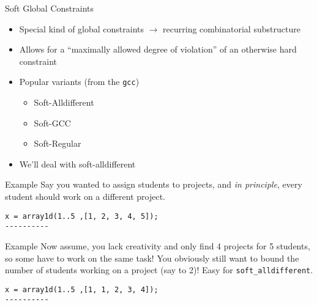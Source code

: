 \documentclass[10pt,xcolor={dvipsnames},fleqn]{beamer}
\begin{document}
\begin{frame}{Soft Global Constraints}
\begin{itemize}
\item Special kind of global constraints $\rightarrow$ recurring combinatorial substructure
\item Allows for a ``maximally allowed degree of violation'' of an otherwise hard constraint

\vspace*{2ex}
\item Popular variants (from the \texttt{gcc})
\begin{itemize}
\item Soft-Alldifferent
\item Soft-GCC
\item Soft-Regular
\end{itemize}
\item We'll deal with \alert{soft-alldifferent}
\end{itemize}
\end{frame}

\begin{frame}[fragile]{Example}
Say you wanted to assign students to projects, and \emph{in principle},
every student should work on a different project.


\begin{verbatim}
x = array1d(1..5 ,[1, 2, 3, 4, 5]);
----------
\end{verbatim}
\end{frame}

\begin{frame}[fragile]{Example}
Now assume, you lack creativity and only find 4 projects for 5 students,
so some have to work on the same task! You obviously still want to 
bound the number of students working on a project (say to 2)! Easy for \texttt{soft\_alldifferent}.


\begin{verbatim}
x = array1d(1..5 ,[1, 1, 2, 3, 4]);
----------
\end{verbatim}
\end{frame}
\end{document}
